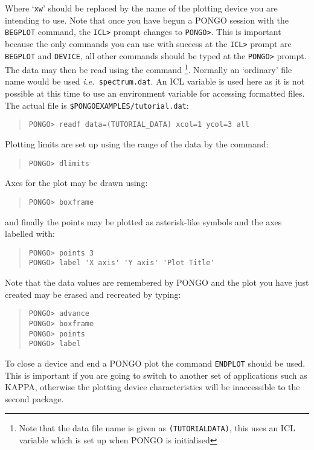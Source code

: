 \documentclass[twoside,11pt]{article}
\newcommand{\htmlref}[2]{#1}
\newcommand{\xref}[3]{#1}
\renewcommand{\_}{\texttt{\symbol{95}}}
\newcommand{\ie}{{\em i.e.\ }}
\newcommand{\cnam}[1]{{\tt #1}}
\newcommand{\iref} [1]{\htmlref{#1}{#1}}
\begin{document}
Where `\verb+xw+' should be replaced by the name of the plotting device you
are intending to use.  Note that once you have begun a PONGO session
with the \cnam{\iref{BEGPLOT}} command, the \verb+ICL>+ prompt changes
to \verb+PONGO>+. This is important because the only commands you can
use with success at the \verb+ICL>+ prompt are \cnam{\iref{BEGPLOT}}
and \cnam{\iref{DEVICE}}, all other commands should be typed at the
\verb+PONGO>+ prompt. The data may then be read using the
command \footnote{Note that the data file name is given as
\texttt{(TUTORIAL\_DATA)}, this uses an ICL variable which is set up
when PONGO is initialised}. Normally an `ordinary' file name would be
used \ie \texttt{spectrum.dat}. An ICL variable is used here as it is
not possible at this time to use an environment variable for accessing
formatted files. The actual file is
\texttt{\$PONGO\_EXAMPLES/tutorial.dat}:

\begin{quote}
\begin{verbatim}
PONGO> readf data=(TUTORIAL_DATA) xcol=1 ycol=3 all
\end{verbatim}
\end{quote}
Plotting limits are set up using the range of the data by the command:
\begin{quote}
\begin{verbatim}
PONGO> dlimits
\end{verbatim}
\end{quote}
Axes for the plot may be drawn using:
\begin{quote}
\begin{verbatim}
PONGO> boxframe
\end{verbatim}
\end{quote}
and finally the points may be plotted as asterisk-like symbols and the axes
labelled with:
\begin{quote}
\begin{verbatim}
PONGO> points 3
PONGO> label 'X axis' 'Y axis' 'Plot Title'
\end{verbatim}
\end{quote}
Note that the data values are remembered by PONGO and the plot you have
just created may be erased and recreated by typing:
\begin{quote}
\begin{verbatim}
PONGO> advance
PONGO> boxframe
PONGO> points
PONGO> label
\end{verbatim}
\end{quote}
To close a device and end a PONGO plot the command
\cnam{\iref{ENDPLOT}} should be used.  This is important if you are
going to switch to another set of applications such as
\xref{KAPPA}{sun95}{}, otherwise the plotting device characteristics
will be inaccessible to the second package.
\end{document}
